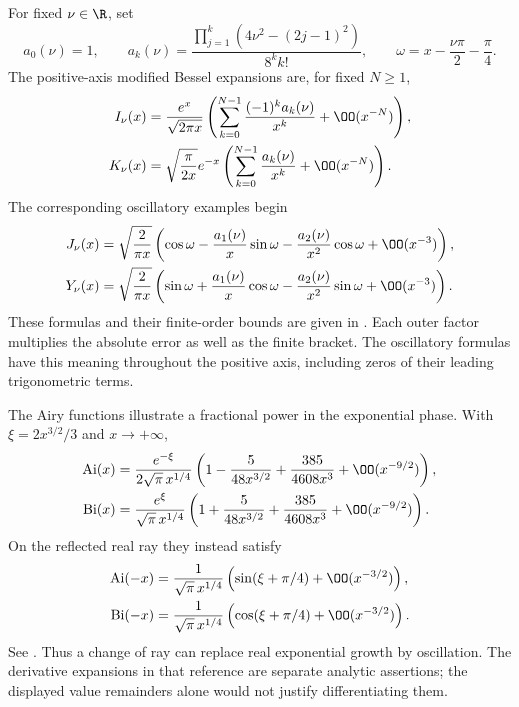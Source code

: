 For fixed $\nu\in\R$, set
\[
 a_0(\nu)=1,\qquad
 a_k(\nu)=\frac{\prod_{j=1}^k(4\nu^2-(2j-1)^2)}{8^k k!},
 \qquad \omega=x-\frac{\nu\pi}{2}-\frac{\pi}{4}.
\]
The positive-axis modified Bessel expansions are, for fixed $N\ge1$,
\begin{equation}
\begin{aligned}
 I_\nu(x)
 &=\frac{e^x}{\sqrt{2\pi x}}
   \left(\sum_{k=0}^{N-1}\frac{(-1)^ka_k(\nu)}{x^k}
         +\OO(x^{-N})\right),\\
 K_\nu(x)
 &=\sqrt{\frac{\pi}{2x}}e^{-x}
   \left(\sum_{k=0}^{N-1}\frac{a_k(\nu)}{x^k}
         +\OO(x^{-N})\right).
\end{aligned}
\label{eq:special-function-modified-bessel}
\end{equation}
The corresponding oscillatory examples begin
\begin{equation}
\begin{aligned}
 J_\nu(x)&=\sqrt{\frac{2}{\pi x}}
   \left(\cos\omega-\frac{a_1(\nu)}x\sin\omega
       -\frac{a_2(\nu)}{x^2}\cos\omega+\OO(x^{-3})\right),\\
 Y_\nu(x)&=\sqrt{\frac{2}{\pi x}}
   \left(\sin\omega+\frac{a_1(\nu)}x\cos\omega
       -\frac{a_2(\nu)}{x^2}\sin\omega+\OO(x^{-3})\right).
\end{aligned}
\label{eq:special-function-oscillatory-bessel}
\end{equation}
These formulas and their finite-order bounds are given in
\cite[\S\S10.17, 10.40]{dlmf}. Each outer factor multiplies the
absolute error as well as the finite bracket. The oscillatory formulas
have this meaning throughout the positive axis, including zeros of
their leading trigonometric terms.

The Airy functions illustrate a fractional power in the exponential
phase. With $\xi=2x^{3/2}/3$ and $x\to+\infty$,
\begin{equation}
\begin{aligned}
 \operatorname{Ai}(x)
 &=\frac{e^{-\xi}}{2\sqrt{\pi}\,x^{1/4}}
   \left(1-\frac5{48x^{3/2}}+\frac{385}{4608x^3}
              +\OO(x^{-9/2})\right),\\
 \operatorname{Bi}(x)
 &=\frac{e^\xi}{\sqrt{\pi}\,x^{1/4}}
   \left(1+\frac5{48x^{3/2}}+\frac{385}{4608x^3}
              +\OO(x^{-9/2})\right).
\end{aligned}
\label{eq:special-function-airy-positive}
\end{equation}
On the reflected real ray they instead satisfy
\begin{equation}
\begin{aligned}
 \operatorname{Ai}(-x)&=\frac1{\sqrt{\pi}\,x^{1/4}}
        \left(\sin(\xi+\pi/4)+\OO(x^{-3/2})\right),\\
 \operatorname{Bi}(-x)&=\frac1{\sqrt{\pi}\,x^{1/4}}
        \left(\cos(\xi+\pi/4)+\OO(x^{-3/2})\right).
\end{aligned}
\label{eq:special-function-airy-negative}
\end{equation}
See \cite[\S9.7]{dlmf}. Thus a change of ray can replace real
exponential growth by oscillation. The derivative expansions in that
reference are separate analytic assertions; the displayed value
remainders alone would not justify differentiating them.

